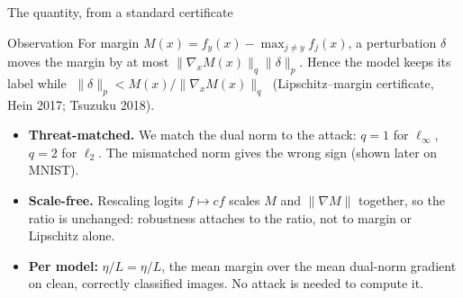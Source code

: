 \documentclass[aspectratio=169,10pt]{beamer}
\newcommand{\etaL}{\ensuremath{\eta/L}}
\newcommand{\tb}[1]{{\color{TUMblue}#1}}
\newcommand{\key}[1]{{\color{TUMdarker}\bfseries #1}}
\begin{document}
\begin{frame}{The quantity, from a standard certificate}{}
  \vspace{0.3em}
  \begin{block}{Observation}
    \footnotesize For margin $M(x)=f_y(x)-\max_{j\neq y}f_j(x)$, a perturbation $\delta$ moves the margin
    by at most $\lVert\nabla_x M(x)\rVert_q\lVert\delta\rVert_p$. Hence the model keeps its label while
    $\;\lVert\delta\rVert_p < M(x)/\lVert\nabla_x M(x)\rVert_q\;$ (Lipschitz--margin certificate,
    \tb{Hein 2017; Tsuzuku 2018}).
  \end{block}
  \vspace{0.2em}
  \begin{itemize}\footnotesize\itemsep3pt
    \item \key{Threat-matched.} We match the dual norm to the attack: $q{=}1$ for $\ell_\infty$,
      $q{=}2$ for $\ell_2$. The mismatched norm gives the wrong sign (shown later on MNIST).
    \item \key{Scale-free.} Rescaling logits $f\mapsto cf$ scales $M$ and $\lVert\nabla M\rVert$ together,
      so the ratio is unchanged: robustness attaches to the ratio, not to margin or Lipschitz alone.
    \item \key{Per model:} $\etaL=\eta/L$, the mean margin over the mean dual-norm gradient on clean,
      correctly classified images. No attack is needed to compute it.
  \end{itemize}
\end{frame}
\end{document}
